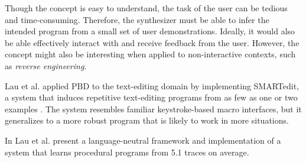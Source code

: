 Though the concept is easy to understand, the task of the user can be tedious
and time-consuming. Therefore, the synthesizer must be able to infer the
intended program from a small set of user demonstrations. Ideally, it would also
be able effectively interact with and receive feedback from the user. However,
the concept might also be interesting when applied to non-interactive contexts,
such as \textit{reverse engineering}.

Lau et al. \cite{Lau2003} applied \ac{PBD} to the text-editing domain by
implementing SMARTedit, a system that induces repetitive text-editing programs
from as few as one or two examples . The system resembles familiar
keystroke-based macro interfaces, but it generalizes to a more robust program
that is likely to work in more situations.

In \cite{Lau:traces:2003} Lau et al. present a language-neutral framework and
implementation of a system that learns procedural programs from 5.1 traces on
average.

